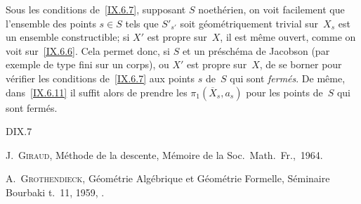 \begin{remarque}
\label{IX.6.12}
Sous les conditions de~\ref{IX.6.7}, supposant $S$ noeth\'erien,
on voit facilement que l'ensemble des points $s\in S$ tels que
$S'_{s'}$ soit g\'eom\'etriquement trivial sur~$X_s$ est un
ensemble constructible; si $X'$ est propre sur~$X$, il est m\^eme
ouvert, comme on voit sur~\ref{IX.6.6}. Cela permet donc, si $S$ et
un pr\'esch\'ema de Jacobson (par exemple de type fini sur un
corps), ou
$X'$ est propre sur~$X$, de se borner pour v\'erifier les conditions
de~\ref{IX.6.7} aux points $s$ de~$S$ qui sont \emph{fermés}. De
m\^eme, dans~\ref{IX.6.11} il suffit alors de prendre les
$\pi_1(\overline X_s,a_s)$ pour les points de~$S$ qui sont ferm\'es.
\end{remarque}

\begin{thebibliography}{D}{IX.7}

 J.\, \textsc{Giraud}, M\'ethode de la
descente,
M\'emoire 
de la Soc.\ Math.\ Fr.,~1964.

 A.\, \textsc{Grothendieck}, G\'eom\'etrie Alg\'ebrique et
G\'eom\'etrie Formelle, S\'eminaire Bourbaki t.\, 11, 1959,
.
\end{thebibliography}

